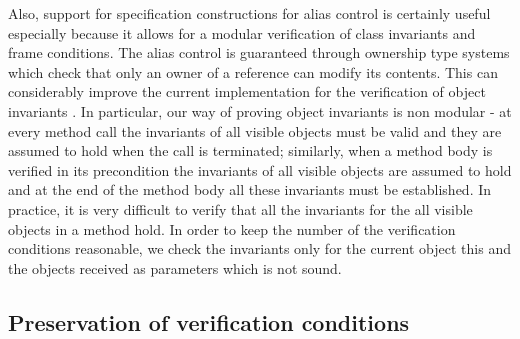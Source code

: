 Also, support for specification constructions for alias control is certainly useful  especially because it allows for a modular verification 
of class invariants and frame conditions.
The alias control is guaranteed through ownership type systems which check that only an owner of a reference can modify its contents.
 This can considerably improve the current implementation for the verification of object invariants  \cite{DietlMueller05}.
In particular, our way of proving object invariants is non modular - at every method call the invariants of all visible 
objects must be valid and they are assumed to hold when the call is terminated; similarly, when a method body is verified in its precondition the invariants of all visible
objects are assumed to hold and at the end of the method body all these invariants must be established. 
In practice, it is very difficult to verify that all the invariants for the all visible objects in a method  hold.
In order to keep the number of the verification conditions reasonable, we check the invariants only for the current object this and the 
objects received as parameters which is not sound.

 
\subsection{Preservation of verification conditions}

